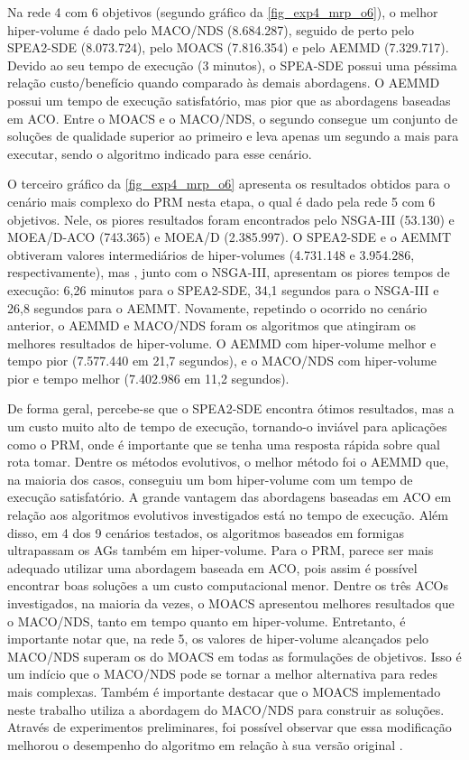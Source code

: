 Na rede 4 com 6 objetivos (segundo gráfico da \autoref{fig_exp4_mrp_o6}), o melhor hiper-volume é dado pelo MACO/NDS (8.684.287), seguido de perto pelo SPEA2-SDE (8.073.724), pelo MOACS (7.816.354) e pelo AEMMD (7.329.717). Devido ao seu tempo de execução (3 minutos), o SPEA-SDE possui uma péssima relação custo/benefício quando comparado às demais abordagens. O AEMMD possui um tempo de execução satisfatório, mas pior que as abordagens baseadas em ACO. Entre o MOACS e o MACO/NDS, o segundo consegue um conjunto de soluções de qualidade superior ao primeiro e leva apenas um segundo a mais para executar, sendo o algoritmo indicado para esse cenário.

O terceiro gráfico da \autoref{fig_exp4_mrp_o6} apresenta os resultados obtidos para o cenário mais complexo do PRM nesta etapa, o qual é dado pela rede 5 com 6 objetivos. Nele, os piores resultados foram encontrados pelo NSGA-III (53.130) e MOEA/D-ACO (743.365) e MOEA/D (2.385.997). O SPEA2-SDE e o AEMMT obtiveram valores intermediários de hiper-volumes (4.731.148 e 3.954.286, respectivamente), mas , junto com o NSGA-III, apresentam os piores tempos de execução: 6,26 minutos para o SPEA2-SDE, 34,1 segundos para o NSGA-III e 26,8 segundos para o AEMMT. Novamente, repetindo o ocorrido no cenário anterior, o AEMMD e MACO/NDS foram os algoritmos que atingiram os melhores resultados de hiper-volume. O AEMMD com hiper-volume melhor e tempo pior (7.577.440 em 21,7 segundos), e o MACO/NDS com hiper-volume pior e tempo melhor (7.402.986 em 11,2 segundos).

De forma geral, percebe-se que o SPEA2-SDE encontra ótimos resultados, mas a um custo muito alto de tempo de execução, tornando-o inviável para aplicações como o PRM, onde é importante que se tenha uma resposta rápida sobre qual rota tomar. Dentre os métodos evolutivos, o melhor método foi o AEMMD que, na maioria dos casos, conseguiu um bom hiper-volume com um tempo de execução satisfatório. A grande vantagem das abordagens baseadas em ACO em relação aos algoritmos evolutivos investigados está no tempo de execução. Além disso, em 4 dos 9 cenários testados, os algoritmos baseados em formigas ultrapassam os AGs também em hiper-volume. Para o PRM, parece ser mais adequado utilizar uma abordagem baseada em ACO, pois assim é possível encontrar boas soluções a um custo computacional menor. Dentre os três ACOs investigados, na maioria da vezes, o MOACS apresentou melhores resultados que o MACO/NDS, tanto em tempo quanto em hiper-volume. Entretanto, é importante notar que, na rede 5, os valores de hiper-volume alcançados pelo MACO/NDS superam os do MOACS em todas as formulações de objetivos. Isso é um indício que o MACO/NDS pode se tornar a melhor alternativa para redes mais complexas. Também é importante destacar que o MOACS implementado neste trabalho utiliza a abordagem do MACO/NDS para construir as soluções. Através de experimentos preliminares, foi possível observar que essa modificação melhorou o desempenho do algoritmo em relação à sua versão original \cite{Riveros2016}.

